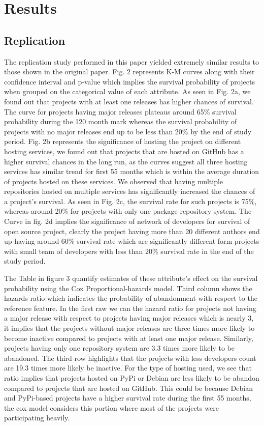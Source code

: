 \documentclass[acmconf]{acmart}
\begin{document}
\section{Results} \label{results}

\subsection{Replication}


The replication study performed in this paper yielded extremely similar results to those shown in the original paper. 
Fig. 2 represents K-M curves along with their confidence interval and p-value which implies the survival probability of projects when grouped on the categorical value of each attribute. 
As seen in Fig. 2a, we found out that projects with at least one releases has higher chances of survival. 
The curve for projects having major releases plateaus around 65\% survival probability during the 120 month mark whereas the survival probability of projects with no major releases end up to be less than 20\% by the end of study period. 
Fig. 2b represents the significance of hosting the project on different hosting services, we found out that projects that are hosted on GitHub has a higher survival chances in the long run, as the curves suggest all three hosting services has similar trend for first 55 months which is within the average duration of projects hosted on these services.
We observed that having multiple repositories hosted on multiple services has significantly increased the chances of a project's survival.
As seen in Fig. 2c, the survival rate for such projects is 75\%, whereas around 20\% for projects with only one package repository system. 
The Curve in fig. 2d implies the significance of network of developers for survival of open source project, clearly the project having more than 20 different authors end up having around 60\% survival rate which are significantly different form projects with small team of developers with less than 20\% survival rate in the end of the study period.

The Table in figure 3 quantify estimates of these attribute's effect on the survival probability using the Cox Proportional-hazards model. 
Third column shows the hazards ratio which indicates the probability of abandonment with respect to the reference feature.
In the first raw we can the hazard ratio for projects not having a major release with respect to projects having major releases which is nearly 3, it implies that the projects without major releases are three times more likely to become inactive compared to projects with at least one major release. 
Similarly, projects having only one repository system are 3.3 times more likely to be abandoned.
The third row highlights that the projects with less developers count are 19.3 times more likely be inactive.
For the type of hosting used, we see that ratio implies that projects hosted on PyPi or Debian are less likely to be abandon compared to projects that are hosted on GitHub. This could be because Debian and PyPi-based projects have a higher survival rate during the first 55 months, the cox model considers this portion where most of the projects were participating heavily.
\end{document}
